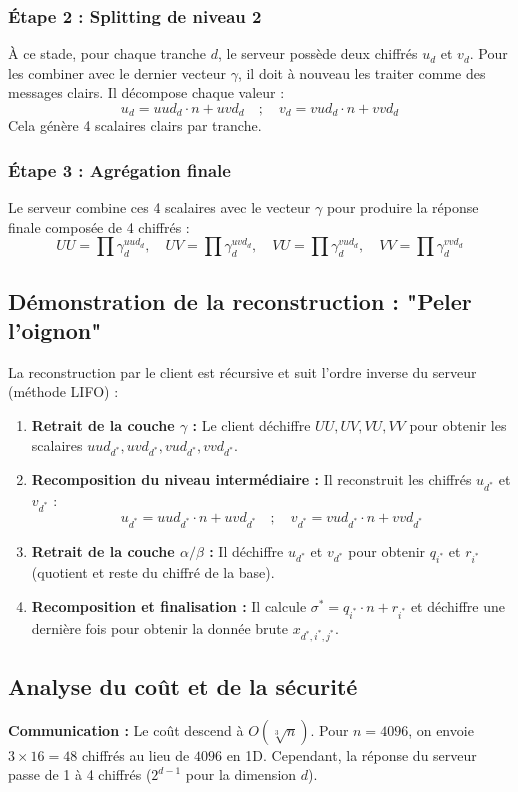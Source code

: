 \documentclass[12pt,a4paper]{report}
\begin{document}
\subsubsection{Étape 2 : Splitting de niveau 2}
À ce stade, pour chaque tranche $d$, le serveur possède deux chiffrés $u_d$ et $v_d$. Pour les combiner avec le dernier vecteur $\gamma$, il doit à nouveau les traiter comme des messages clairs. Il décompose chaque valeur :
\[ u_d = uud_d \cdot n + uvd_d \quad ; \quad v_d = vud_d \cdot n + vvd_d \]
Cela génère 4 scalaires clairs par tranche.

\subsubsection{Étape 3 : Agrégation finale}
Le serveur combine ces 4 scalaires avec le vecteur $\gamma$ pour produire la réponse finale composée de 4 chiffrés :
\[ UU = \prod \gamma_d^{uud_d}, \quad UV = \prod \gamma_d^{uvd_d}, \quad VU = \prod \gamma_d^{vud_d}, \quad VV = \prod \gamma_d^{vvd_d} \]

\subsection{Démonstration de la reconstruction : "Peler l'oignon"}
La reconstruction par le client est récursive et suit l'ordre inverse du serveur (méthode LIFO) :

\begin{enumerate}
    \item \textbf{Retrait de la couche $\gamma$ :} Le client déchiffre $UU, UV, VU, VV$ pour obtenir les scalaires $uud_{d^*}, uvd_{d^*}, vud_{d^*}, vvd_{d^*}$.
    \item \textbf{Recomposition du niveau intermédiaire :} Il reconstruit les chiffrés $u_{d^*}$ et $v_{d^*}$ :
    \[ u_{d^*} = uud_{d^*} \cdot n + uvd_{d^*} \quad ; \quad v_{d^*} = vud_{d^*} \cdot n + vvd_{d^*} \]
    \item \textbf{Retrait de la couche $\alpha/\beta$ :} Il déchiffre $u_{d^*}$ et $v_{d^*}$ pour obtenir $q_{i^*}$ et $r_{i^*}$ (quotient et reste du chiffré de la base).
    \item \textbf{Recomposition et finalisation :} Il calcule $\sigma^* = q_{i^*} \cdot n + r_{i^*}$ et déchiffre une dernière fois pour obtenir la donnée brute $x_{d^*, i^*, j^*}$.
\end{enumerate}

\subsection{Analyse du coût et de la sécurité}
\textbf{Communication :} Le coût descend à $O(\sqrt[3]{n})$. Pour $n=4096$, on envoie $3 \times 16 = 48$ chiffrés au lieu de $4096$ en 1D. Cependant, la réponse du serveur passe de 1 à 4 chiffrés ($2^{d-1}$ pour la dimension $d$).
\end{document}
